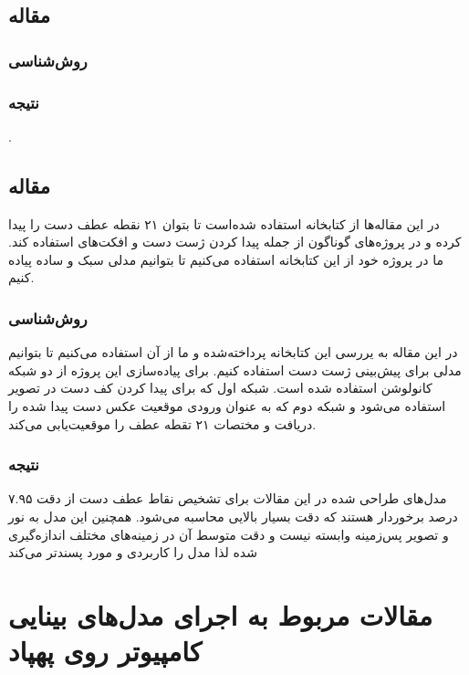 \cite{dang2022improved}


\subsection{مقاله }

\subsubsection{روش‌شناسی}

\subsubsection{نتیجه}
\cite{chen2021visual}.


\subsection{مقاله }
در این مقاله‌ها از کتابخانه  استفاده‌ شده‌است تا بتوان ۲۱ نقطه عطف دست را پیدا کرده و در پروژه‌های گوناگون از جمله پیدا کردن ژست دست و افکت‌های  استفاده کند. ما در پروژه خود از این کتابخانه استفاده می‌کنیم تا بتوانیم مدلی سبک و ساده پیاده کنیم.

\subsubsection{روش‌شناسی}
 در این مقاله به یررسی این کتابخانه پرداخته‌شده و ما از آن استفاده می‌کنیم تا بتوانیم مدلی برای پیش‌بینی ژست دست استفاده کنیم.
برای پیاده‌سازی این پروژه از دو شبکه کانولوشن استفاده شده است. شبکه اول که برای پیدا کردن کف دست در تصویر استفاده می‌شود و شبکه دوم که به عنوان ورودی موقعیت عکس دست پیدا شده را دریافت و مختصات ۲۱ تقطه عطف را موقعیت‌یابی می‌کند.

\subsubsection{نتیجه}
مدل‌های طراحی شده در این مقالات برای تشخیص نقاط عطف دست از دقت ۷.۹۵ درصد برخوردار هستند که دقت بسیار بالایی محاسبه می‌شود. همچنین این مدل به نور و تصویر پس‌زمینه وابسته نیست و دقت متوسط آن در زمینه‌های مختلف اندازه‌گیری شده لذا مدل را کاربردی‌ و مورد پسندتر می‌کند
\cite{zhang2020mediapipe} 







\section{مقالات مربوط به اجرای مدل‌های بینایی کامپیوتر روی پهپاد}
